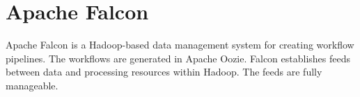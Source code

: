 \section{Apache Falcon}

Apache Falcon \cite{www-hid-sp18-526-apache-falcon} is
a Hadoop-based data management system for creating
workflow pipelines. The workflows are generated in Apache
Oozie. Falcon establishes feeds between data and processing
resources within Hadoop. The feeds are fully manageable.
